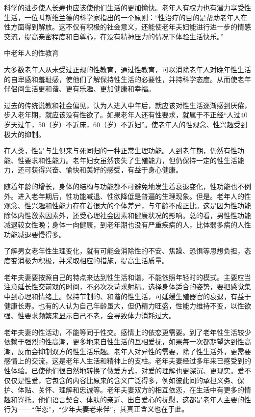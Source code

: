\documentclass[12pt,UTF8,openany]{ctexbook}
\begin{document}
科学的进步使人长寿也应该使他们生活的更加愉快。老年人有权力也有潜力享受性生活，一位叫斯维兰德的科学家指出的一个原则：“性治疗的目的是帮助老年人在性方面得到解放。这不仅有积极的社会意义，还能使老年夫妇能进行进一步的情感交流，提高亲密程度和自尊心，在没有精神压力的情况下体验生活快乐。”





中老年人的性教育


大多数老年人从未受过正规的性教育，通过性教育，可以消除老年人对晚年性生活的自卑感和羞耻感，使他们了解保持性生活的必要性，并持科学态度。从而使老年伴侣间生活更和谐、更有乐趣、更加健康和幸福。

过去的传统说教和社会偏见，认为人进入中年后，就应该对性生活逐渐感到厌倦，步入老年期，就应该没有性欲了。如果老年人还有性要求，就属于不正经“人过40岁天过午，50（岁）不近床，60（岁）不近妇”。使老年人的性观念、性兴趣受到极大的抑制。

在人类，性是与生俱来与死同归的一种正常生理功能。人到老年期，仍然有性功能、性要求和性能力。老年妇女虽然丧失了生殖能力，但仍保持一定的性生活能力，还可获得兴奋、愉快和美好的感受，有益于身心健康。

随着年龄的增长，身体的结构与功能都不可避免地发生着衰退变化，性功能也不例外。进入老年期后，性功能减退、性欲降低是普遍的生理现象。但是。老年人的性观念、性兴趣和性能力存在着很大的个体差异，与年龄不成正比。这是因为性功能除体内性激素因素外，还受心理社会因素和健康状况的影响。总的看，男性性功能减退较女性晚；身体一向健康，到老年期也没有严重疾病的人，比体弱多病的人性功能减退要慢得多。

了解男女老年性生理变化，就有可能会消除性的不安、焦躁、恐惧等思想负担，态度变消极为积极，并采取相应的措施，提高生活质量。

老年夫妻要按照自己的特点来达到性生活和谐，不能依照年轻时的模式。主要应当注意延长性交前戏的时间，不必次次苛求射精。选择身体适合的姿势，要把感觉集中到心理和情绪上。保持节制的、和谐的性生活，可延缓生殖器官的衰退，有益于健康长寿。也有的人认为自己年龄虽大，但仍精力旺盛，性能力维持不变，以性欲强、性要求频繁来显示自己不老，会导致体力消耗过大。

老年夫妻的性活动，不能等同于性交。感情上的依恋更需要。到了老年性生活较少依赖于强烈的性高潮，更多地来自性生活的互相爱抚，如果每一次都期望达到性高潮，反而会抑制双方的性生活乐趣。老年人对异性的需要，除了性生活外，更需要感情上的交流，这是老年人生活和精神上的支柱。老年夫妻经过多年来已感受到的性体验。已使他们很自然地转换了做爱方式，对爱的理解也更深沉、更现实。爱不仅仅是性爱，它包含的内容比原来的含义广泛得多，例如彼此间的承担义务、保护、体贴、关怀、理解和忠诚等。老年夫妻双方的相互依恋，在生活中有更多的情趣和寄托。他们语言契合、体肤的亲近、出自爱心的抚慰，这都是老年人主要的性行为——“伴恋”，“少年夫妻老来伴”，其真正含义也在于此。
\end{document}
